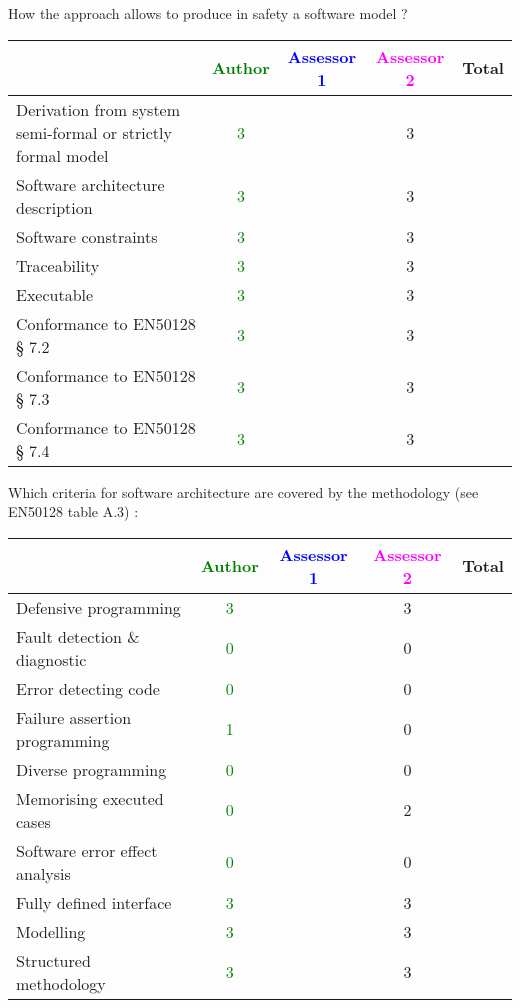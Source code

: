 How the approach allows to  produce in safety a software model ?

\begin{tabular}{|l | c | c | c | c|}
\hline
& \textcolor{green}{Author} & \textcolor{blue}{Assessor 1} & \textcolor{magenta}{Assessor 2} & Total \\
\hline
Derivation from system semi-formal or strictly formal model  & \textcolor{green}{3} & &3 &  \\
\hline 
Software architecture description  & \textcolor{green}{3} & &3 &  \\
\hline
Software constraints  & \textcolor{green}{3} & &3 &  \\
\hline
Traceability  & \textcolor{green}{3} & &3 &  \\
\hline
Executable  & \textcolor{green}{3} & &3 &  \\
\hline
Conformance to EN50128 § 7.2  & \textcolor{green}{3} & &3 &  \\
\hline
Conformance to EN50128 § 7.3  & \textcolor{green}{3} & &3 &  \\
\hline
Conformance to EN50128 § 7.4  & \textcolor{green}{3}& &3 &  \\
\hline
\end{tabular}

Which criteria for software architecture are covered by the methodology
(see EN50128 table A.3) :

\begin{tabular}{|l | c | c | c | c|}
\hline
& \textcolor{green}{Author} & \textcolor{blue}{Assessor 1} & \textcolor{magenta}{Assessor 2} & Total \\
\hline
Defensive programming  & \textcolor{green}{3} & &3 &  \\
\hline 
Fault detection \& diagnostic  & \textcolor{green}{0} & &0 &  \\
\hline
Error detecting code  & \textcolor{green}{0} & &0 &  \\
\hline
Failure assertion programming & \textcolor{green}{1} & &0 &  \\
\hline
Diverse programming & \textcolor{green}{0} & &0 &  \\
\hline
Memorising executed cases & \textcolor{green}{0} & &2 &  \\
\hline
Software error effect analysis & \textcolor{green}{0} & &0 &  \\
\hline
Fully defined interface & \textcolor{green}{3} & &3 &  \\
\hline
Modelling  & \textcolor{green}{3} & &3 &  \\
\hline
Structured methodology & \textcolor{green}{3} & &3 &  \\
\hline
\end{tabular}

